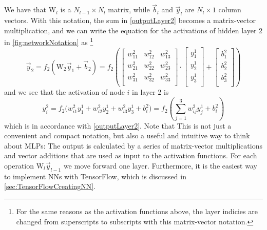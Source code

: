 \documentclass[twoside,english]{uiofysmaster}
\begin{document}
We have that $\mathrm{W}_l$ is a $N_{l-1} \times N_l$ matrix, while $\vec{b}_l$ and $\vec{y}_l$ are $N_l \times 1$ column vectors. 
With this notation, the sum in \eqref{outputLayer2} becomes a matrix-vector multiplication, and we can write
the equation for the activations of hidden layer 2 in \autoref{fig:networkNotation} as%
\footnote{For the same reasons as the activation functions above, the layer indicies are changed from superscripts to subscripts
          with this matrix-vector notation.}
\begin{equation}
 \vec{y}_2 = f_2(\mathrm{W}_2 \vec{y}_{1} + \vec{b}_{2}) = 
 f_2\left(\left[\begin{array}{ccc}
    w^2_{11} &w^2_{12} &w^2_{13} \\
    w^2_{21} &w^2_{22} &w^2_{23} \\
    w^2_{31} &w^2_{32} &w^2_{33} \\
    \end{array} \right] \cdot
    \left[\begin{array}{c}
           y^1_1 \\
           y^1_2 \\
           y^1_3 \\
          \end{array}\right] + 
    \left[\begin{array}{c}
           b^2_1 \\
           b^2_2 \\
           b^2_3 \\
          \end{array}\right]\right)
\end{equation}
and we see that the activation of node $i$ in layer 2 is
\begin{equation}
 y^2_i = f_2\Bigr(w^2_{i1}y^1_1 + w^2_{i2}y^1_2 + w^2_{i3}y^1_3 + b^2_i\Bigr) = 
 f_2\left(\sum_{j=1}^3 w^2_{ij} y_j^1 + b^2_i\right)
\end{equation} 
which is in accordance with \eqref{outputLayer2}. Note that
This is not just a convenient and compact notation, but also 
a useful and intuitive way to think about MLPs: The output is calculated by a series of matrix-vector multiplications
and vector additions that are used as input to the activation functions. For each operation 
$\mathrm{W}_l \vec{y}_{l-1}$ we move forward one layer. Furthermore, it is the easiest way to implement NNs with 
TensorFlow, which is discussed in \autoref{sec:TensorFlowCreatingNN}. 
\end{document}
